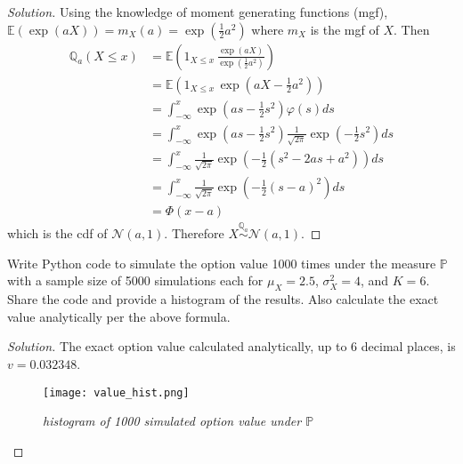\documentclass[10pt]{article}
\newcommand{\E}{\mathbb{E}}
\newcommand{\Q}{\mathbb{Q}}
\newenvironment{problem}[2][Problem]{\begin{trivlist}
\item[\hskip \labelsep {\bfseries #1}\hskip \labelsep {\bfseries #2.}]}{\end{trivlist}}
\begin{document}
\begin{proof}[Solution]
    Using the knowledge of moment generating functions (mgf), $\E(\exp(aX)) = m_X(a) = \exp{\left(\frac{1}{2} a^2\right)}$ where $m_X$ is the mgf of $X$. Then
    \begin{align*}
        \Q_a(X \leq x) &= \E \left(1_{X \leq x} \, \frac{\exp{(aX)}}{\exp{(\frac{1}{2}a^2)}}\right) \\
        &= \E \left(1_{X \leq x} \, \exp{\left(aX - \frac{1}{2}a^2\right)}\right) \\
        &= \int_{-\infty}^{x} \exp{\left(as - \frac{1}{2}s^2\right)} \varphi(s) ds \\
        &= \int_{-\infty}^{x} \exp{\left(as - \frac{1}{2}s^2\right)} \frac{1}{\sqrt{2\pi}} \exp{\left(-\frac{1}{2}s^2\right)} ds \\
        &= \int_{-\infty}^{x} \frac{1}{\sqrt{2\pi}} \exp{\left(-\frac{1}{2}(s^2 - 2as + a^2)\right)} ds \\
        &= \int_{-\infty}^{x} \frac{1}{\sqrt{2\pi}} \exp{\left(-\frac{1}{2}(s - a)^2\right)} ds \\
        &= \Phi{(x - a)}
    \end{align*}
    which is the cdf of $\mathcal{N}(a, 1)$. Therefore $X \overset{\Q_a}{\sim} \mathcal{N}(a, 1)$.
\end{proof}



\begin{problem}{4}
    Write Python code to simulate the option value 1000 times under the measure $\mathbb{P}$ with a sample size of 5000 simulations each for $\mu_X = 2.5$, $\sigma_X^2 = 4$, and $K = 6$.
    Share the code and provide a histogram of the results.
    Also calculate the exact value analytically per the above formula.
\end{problem}
    
\begin{proof}[Solution]
    The exact option value calculated analytically, up to 6 decimal places, is $v = 0.032348$.
    \begin{figure}[H]
        \begin{center}
            \texttt{[image: value\_hist.png]}
            \caption{\textit{histogram of 1000 simulated option value under $\mathbb{P}$}}
            \label{fig:value_hist}
        \end{center}
    \end{figure}
    
\end{proof}
\end{document}
